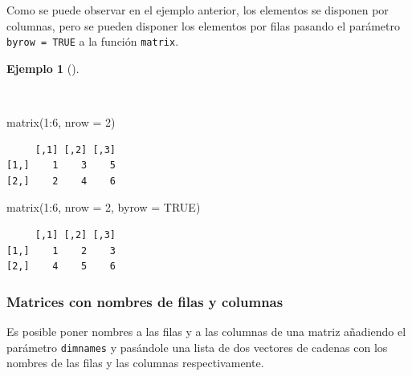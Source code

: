 \documentclass[
  a4paper,
]{scrreport}
\newenvironment{Shaded}{\begin{snugshade}}{\end{snugshade}}
\newcommand{\AttributeTok}[1]{\textcolor[rgb]{0.40,0.45,0.13}{#1}}
\newcommand{\ConstantTok}[1]{\textcolor[rgb]{0.56,0.35,0.01}{#1}}
\newcommand{\DecValTok}[1]{\textcolor[rgb]{0.68,0.00,0.00}{#1}}
\newcommand{\FunctionTok}[1]{\textcolor[rgb]{0.28,0.35,0.67}{#1}}
\newcommand{\NormalTok}[1]{\textcolor[rgb]{0.00,0.23,0.31}{#1}}
\newcommand{\SpecialCharTok}[1]{\textcolor[rgb]{0.37,0.37,0.37}{#1}}
\theoremstyle{definition}
\theoremstyle{definition}
\newtheorem{example}{Ejemplo}[chapter]
\theoremstyle{remark}
\begin{document}
Como se puede observar en el ejemplo anterior, los elementos se disponen
por columnas, pero se pueden disponer los elementos por filas pasando el
parámetro \texttt{byrow\ =\ TRUE} a la función \texttt{matrix}.

\begin{example}[]\protect\hypertarget{exm-creacion-matrices-por-filas}{}\label{exm-creacion-matrices-por-filas}

~

\begin{Shaded}
\begin{Highlighting}[]
\FunctionTok{matrix}\NormalTok{(}\DecValTok{1}\SpecialCharTok{:}\DecValTok{6}\NormalTok{, }\AttributeTok{nrow =} \DecValTok{2}\NormalTok{)}
\end{Highlighting}
\end{Shaded}

\begin{verbatim}
     [,1] [,2] [,3]
[1,]    1    3    5
[2,]    2    4    6
\end{verbatim}

\begin{Shaded}
\begin{Highlighting}[]
\FunctionTok{matrix}\NormalTok{(}\DecValTok{1}\SpecialCharTok{:}\DecValTok{6}\NormalTok{, }\AttributeTok{nrow =} \DecValTok{2}\NormalTok{, }\AttributeTok{byrow =} \ConstantTok{TRUE}\NormalTok{)}
\end{Highlighting}
\end{Shaded}

\begin{verbatim}
     [,1] [,2] [,3]
[1,]    1    2    3
[2,]    4    5    6
\end{verbatim}

\end{example}

\hypertarget{matrices-con-nombres-de-filas-y-columnas}{%
\subsubsection{Matrices con nombres de filas y
columnas}\label{matrices-con-nombres-de-filas-y-columnas}}

Es posible poner nombres a las filas y a las columnas de una matriz
añadiendo el parámetro \texttt{dimnames} y pasándole una lista de dos
vectores de cadenas con los nombres de las filas y las columnas
respectivamente.
\end{document}
